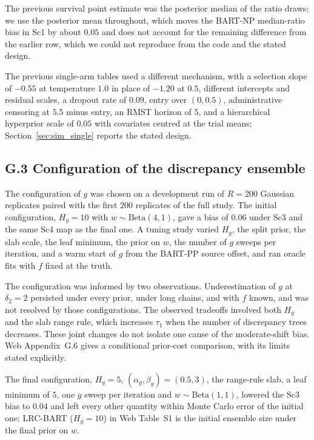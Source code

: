 \documentclass[11pt]{article}
\theoremstyle{definition}
\theoremstyle{plain}
\begin{document}
The previous survival point estimate was the posterior median of the ratio draws; we use the posterior mean throughout, which moves the BART-NP median-ratio bias in Sc1 by about $0.05$ and does not account for the remaining difference from the earlier row, which we could not reproduce from the code and the stated design.

The previous single-arm tables used a different mechanism, with a selection slope of $-0.55$ at temperature $1.0$ in place of $-1.20$ at $0.5$, different intercepts and residual scales, a dropout rate of $0.09$, entry over $(0,0.5)$, administrative censoring at $5.5$ minus entry, an RMST horizon of $5$, and a hierarchical hyperprior scale of $0.05$ with covariates centred at the trial means; Section~\ref{sec:sim_single} reports the stated design.

\subsection*{G.3 Configuration of the discrepancy ensemble}

The configuration of $g$ was chosen on a development run of $R=200$ Gaussian replicates paired with the first $200$ replicates of the full study. The initial configuration, $H_g=10$ with $w\sim\mathrm{Beta}(4,1)$, gave a bias of $0.06$ under Sc3 and the same Sc4 map as the final one. A tuning study varied $H_g$, the split prior, the slab scale, the leaf minimum, the prior on $w$, the number of $g$ sweeps per iteration, and a warm start of $g$ from the BART-PP source offset, and ran oracle fits with $f$ fixed at the truth.

The configuration was informed by two observations. Underestimation of $g$ at $\delta_2=2$ persisted under every prior, under long chains, and with $f$ known, and was not resolved by those configurations. The observed tradeoffs involved both $H_g$ and the slab range rule, which increases $\tau_1$ when the number of discrepancy trees decreases. These joint changes do not isolate one cause of the moderate-shift bias. Web Appendix~G.6 gives a conditional prior-cost comparison, with its limits stated explicitly.

The final configuration, $H_g=5$, $(\alpha_g,\beta_g)=(0.5,3)$, the range-rule slab, a leaf minimum of $5$, one $g$ sweep per iteration and $w\sim\mathrm{Beta}(1,1)$, lowered the Sc3 bias to $0.04$ and left every other quantity within Monte Carlo error of the initial one; LRC-BART ($H_g=10$) in Web Table~S1 is the initial ensemble size under the final prior on $w$.
\end{document}
